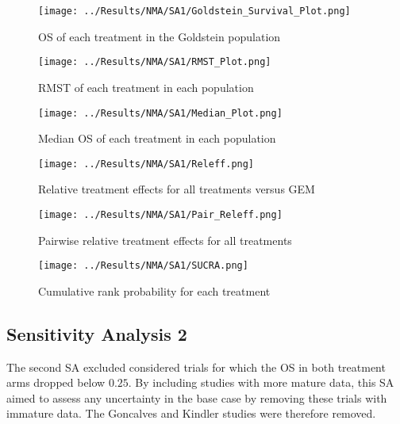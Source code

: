 \begin{figure}[h]
    \centering
    \texttt{[image: ../Results/NMA/SA1/Goldstein\_Survival\_Plot.png]}
    \caption{OS of each treatment in the Goldstein population}
    \label{fig:pred_surv_goldstein_SA1}
\end{figure}

\begin{figure}[h]
    \centering
    \texttt{[image: ../Results/NMA/SA1/RMST\_Plot.png]}
    \caption{RMST of each treatment in each population}
    \label{fig:pred_rmst_SA1}
\end{figure}

\begin{figure}[h]
    \centering
    \texttt{[image: ../Results/NMA/SA1/Median\_Plot.png]}
    \caption{Median OS of each treatment in each population}
    \label{fig:pred_median_SA1}
\end{figure}

\begin{figure}[h]
    \centering
    \texttt{[image: ../Results/NMA/SA1/Releff.png]}
    \caption{Relative treatment effects for all treatments versus GEM}
    \label{fig:releff_SA1}
\end{figure}

\begin{figure}[h]
    \centering
    \texttt{[image: ../Results/NMA/SA1/Pair\_Releff.png]}
    \caption{Pairwise relative treatment effects for all treatments}
    \label{fig:pair_releff_SA1}
\end{figure}

\begin{figure}[h]
    \centering
    \texttt{[image: ../Results/NMA/SA1/SUCRA.png]}
    \caption{Cumulative rank probability for each treatment}
    \label{fig:sucra_SA1}
\end{figure}

\clearpage
\subsection{Sensitivity Analysis 2}
The second SA excluded considered trials for which the OS in both treatment arms dropped below $0.25$. By including studies with more mature data, this SA aimed to assess any uncertainty in the base case by removing these trials with immature data. The Goncalves and Kindler studies were therefore removed. 

